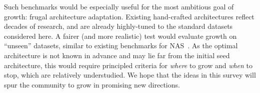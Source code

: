 Such benchmarks would be especially useful for the most ambitious goal of growth: frugal architecture adaptation. Existing hand-crafted architectures reflect decades of research, and are already highly-tuned to the standard datasets considered here. A fairer (and more realistic) test would evaluate growth on ``unseen'' datasets, similar to existing benchmarks for NAS~\citep{geada_unseennaschallenge_2024}. As the optimal architecture is not known in advance and may lie far from the initial seed architecture, this would require principled criteria for \emph{where} to grow and \emph{when} to stop, which are relatively understudied. We hope that the ideas in this survey will spur the community to grow in promising new directions.
